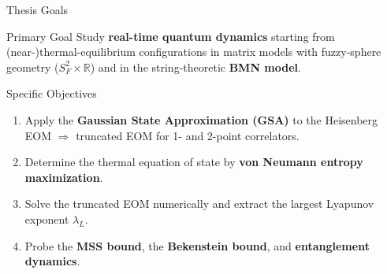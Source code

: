 \documentclass{beamer}
\newcommand{\hl}[1]{{\color{metured}\textbf{#1}}}
\newcommand{\new}[1]{{\color{metuaccent}\textbf{#1}}}
\begin{document}
\begin{frame}{Thesis Goals}
  \begin{block}{Primary Goal}
    Study \textbf{real-time quantum dynamics} starting from (near-)thermal-equilibrium configurations in matrix models with fuzzy-sphere geometry ($S_F^2\times\mathbb{R}$) and in the string-theoretic \new{BMN model}.
  \end{block}
  \vspace{-0.8em} \begin{block}{Specific Objectives} \begin{enumerate}
      \item Apply the \hl{Gaussian State Approximation (GSA)} to the Heisenberg EOM $\Rightarrow$ truncated EOM for 1- and 2-point correlators.
      \item Determine the thermal equation of state by \hl{von Neumann entropy maximization}.
      \item Solve the truncated EOM numerically and extract the largest Lyapunov exponent $\lambda_L$.
      \item Probe the \new{MSS bound}, the \new{Bekenstein bound}, and \new{entanglement dynamics}.
    \end{enumerate}
  \end{block}
\end{frame}
\end{document}
